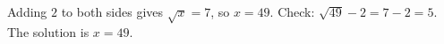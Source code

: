 Adding $2$ to both sides gives $\sqrt x=7$, so $x=49$. Check: $\sqrt{49}-2=7-2=5$. The solution is $x=\boxed{49}$.
